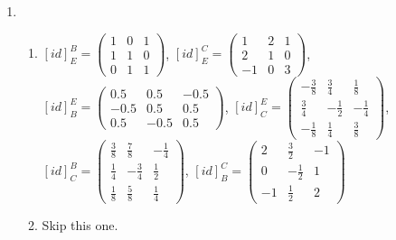 \documentclass{article}
\begin{document}
\begin{enumerate}
\begin{enumerate}
\end{enumerate}

\item

\begin{enumerate}

\item $[id]^B_E = \left(\begin{array}{ccc} 1 & 0 & 1 \\ 1 & 1 & 0 \\ 0 & 1 & 1 \end{array}\right)$, $[id]^C_E = \left(\begin{array}{ccc} 1 & 2 & 1 \\ 2 & 1 & 0 \\ -1 & 0 & 3 \end{array}\right)$, $[id]^E_B = \left(\begin{array}{ccc} 0.5 & 0.5 & -0.5 \\ -0.5 & 0.5 & 0.5 \\ 0.5 & -0.5 & 0.5 \end{array}\right)$, $[id]^E_C = \left(\begin{array}{ccc} -\frac{3}{8} & \frac{3}{4} & \frac{1}{8} \\ \frac{3}{4} & -\frac{1}{2} & -\frac{1}{4} \\ -\frac{1}{8} & \frac{1}{4} & \frac{3}{8} \end{array}\right)$, $[id]^B_C = \left(\begin{array}{ccc} \frac{3}{8} & \frac{7}{8} & -\frac{1}{4} \\ \frac{1}{4} & -\frac{3}{4} & \frac{1}{2} \\ \frac{1}{8} & \frac{5}{8} & \frac{1}{4} \end{array}\right)$, $[id]^C_B = \left(\begin{array}{ccc} 2 & \frac{3}{2} & -1 \\ 0 & -\frac{1}{2} & 1 \\ -1 & \frac{1}{2} & 2 \end{array}\right)$

\item Skip this one.


\end{enumerate}
\end{enumerate}
\end{document}
